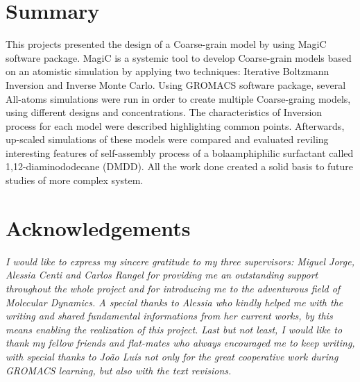 \documentclass[10pt,a4paper,twoside]{article}
\begin{document}
\section{Summary}
\setcounter{page}{1}
This projects presented the design of a Coarse-grain model by using MagiC software package. MagiC is a  systemic tool to develop Coarse-grain models based on an atomistic simulation by applying two techniques: Iterative Boltzmann Inversion and Inverse Monte Carlo. Using GROMACS software package, several All-atoms simulations were run in order to create multiple Coarse-graing models, using different designs and concentrations. The characteristics of Inversion process for each model were described highlighting common points.  Afterwards, up-scaled simulations of these models were compared and evaluated reviling interesting features of self-assembly process of a bolaamphiphilic surfactant called 1,12-diaminododecane (DMDD). All the work done created a solid basis to future studies of more complex system.

\vfill
\newpage

\setcounter{tocdepth}{3}
\tableofcontents



\vfill
\newpage

\section{Acknowledgements}

\textit{I would like to express my sincere gratitude to my three supervisors: Miguel Jorge, Alessia Centi and Carlos Rangel for providing me an outstanding support throughout the whole project and for introducing me to the adventurous field of Molecular Dynamics. A special thanks to Alessia who kindly helped me with the writing and shared fundamental informations from her current works, by this means enabling the realization of this project.
Last but not least, I would like to thank my fellow friends and flat-mates who always encouraged me to keep writing, with special thanks to João Luís not only for the great cooperative work during GROMACS learning, but also with the text revisions.}

\vfill
\newpage

\end{document}
